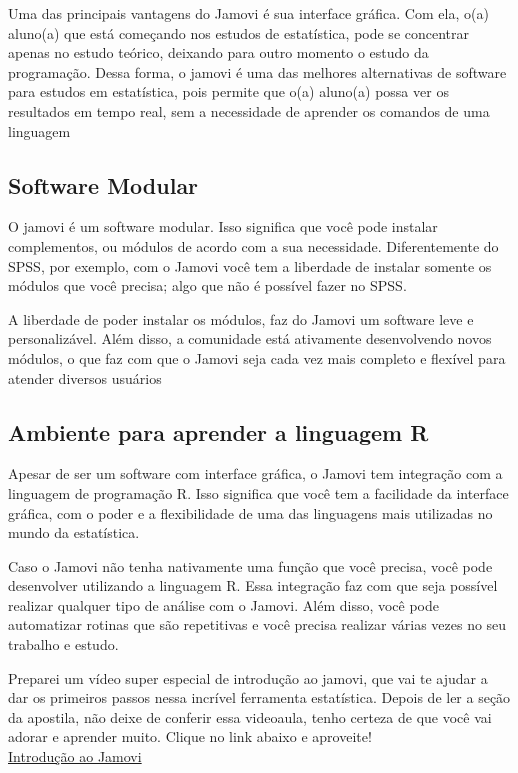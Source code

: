 Uma das principais vantagens do Jamovi é sua interface gráfica. Com ela, o(a) aluno(a) que está começando nos estudos de estatística, pode se concentrar apenas no estudo teórico, deixando para outro momento o estudo da programação. Dessa forma, o jamovi é uma das melhores alternativas de software para estudos em estatística, pois permite que o(a) aluno(a) possa ver os resultados em tempo real, sem a necessidade de aprender os comandos de uma linguagem

\subsection{Software Modular}

O jamovi é um software modular. Isso significa que você pode instalar complementos, ou módulos de acordo com a sua necessidade. Diferentemente do SPSS, por exemplo, com o Jamovi você tem a liberdade de instalar somente os módulos que você precisa; algo que não é possível fazer no SPSS.

A liberdade de poder instalar os módulos, faz do Jamovi um software leve e personalizável. Além disso, a comunidade está ativamente desenvolvendo novos módulos, o que faz com que o Jamovi seja cada vez mais completo e flexível para atender diversos usuários

\subsection{Ambiente para aprender a linguagem R}

Apesar de ser um software com interface gráfica, o Jamovi tem integração com a linguagem de programação R. Isso significa que você tem a facilidade da interface gráfica, com o poder e a flexibilidade de uma das linguagens mais utilizadas no mundo da estatística.

Caso o Jamovi não tenha nativamente uma função que você precisa, você pode desenvolver utilizando a linguagem R. Essa integração faz com que seja possível realizar qualquer tipo de análise com o Jamovi. Além disso, você pode automatizar rotinas que são repetitivas e você precisa realizar várias vezes no seu trabalho e estudo.

\begin{tcolorbox}[colback=white,colframe=green!50!black,title= Dica de Conteúdo]
  Preparei um vídeo super especial de introdução ao jamovi, que vai te ajudar a dar os primeiros passos nessa incrível ferramenta estatística. Depois de ler a seção da apostila, não deixe de conferir essa videoaula, tenho certeza de que você vai adorar e aprender muito. Clique no link abaixo e aproveite!\\
  \faYoutube{} \href{https://www.youtube.com/watch?v=0zGH20Fa_JA&t=2s}{Introdução ao Jamovi}
\end{tcolorbox}

